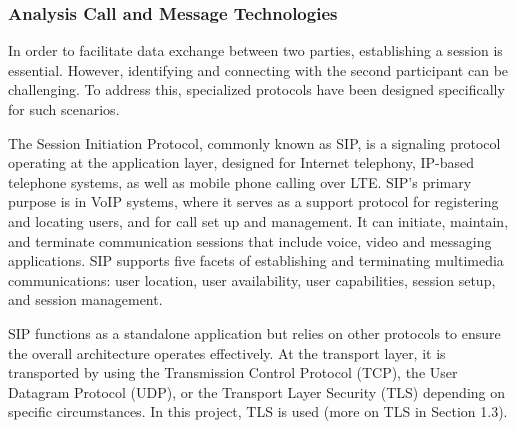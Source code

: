 \subsubsection{Analysis Call and Message Technologies}

    In order to facilitate data exchange between two parties, 
    establishing a session is essential. However, identifying and connecting with 
    the second participant can be challenging. To address this, specialized protocols 
    have been designed specifically for such scenarios.

    \noindent The Session Initiation Protocol, 
    commonly known as SIP, is a signaling protocol operating at the 
    application layer, designed for Internet telephony, IP-based telephone systems, 
    as well as mobile phone calling over LTE. SIP’s primary purpose is in VoIP systems, where it serves 
    as a support protocol for registering and locating users, and for call set up and management. It can initiate, maintain, 
    and terminate communication sessions that include voice, video and messaging applications. SIP supports five facets of establishing and terminating multimedia communications: 
    user location, user availability, user capabilities, session setup, and session management. 

    \noindent SIP functions as a standalone application but relies on other protocols 
    to ensure the overall architecture operates effectively. At the transport layer, 
    it is transported by using the Transmission Control Protocol (TCP), the User Datagram Protocol (UDP), 
    or the Transport Layer Security (TLS) depending on specific circumstances. In this project, 
    TLS is used (more on TLS in Section 1.3).

